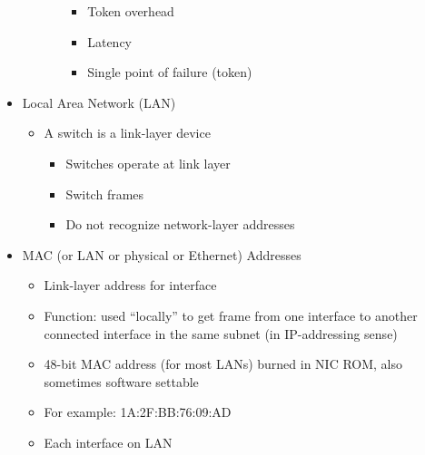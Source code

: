 \begin{itemize}
\begin{itemize}
\begin{itemize}
\begin{itemize}
              \item Token overhead

              \item Latency

              \item Single point of failure (token)

            \end{itemize}

        \end{itemize}

    \end{itemize}

  \item Local Area Network (LAN)

    \begin{itemize}

      \item A switch is a link-layer device

        \begin{itemize}

          \item Switches operate at link layer

          \item Switch frames

          \item Do not recognize network-layer addresses

        \end{itemize}

    \end{itemize}

  \item MAC (or LAN or physical or Ethernet) Addresses

    \begin{itemize}

      \item Link-layer address for interface

      \item Function: used ``locally'' to get frame from one interface to another connected interface in the same subnet (in IP-addressing sense)

      \item 48-bit MAC address (for most LANs) burned in NIC ROM, also sometimes software settable

      \item For example: 1A:2F:BB:76:09:AD

      \item Each interface on LAN


\end{itemize}
\end{itemize}
